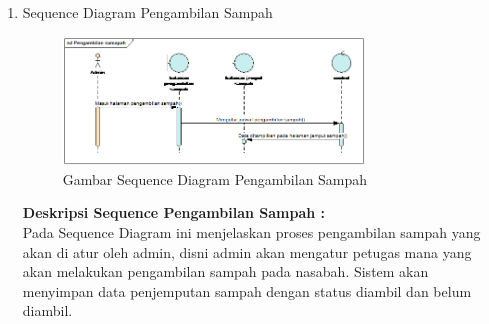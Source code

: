 \begin{enumerate}
\item Sequence Diagram Pengambilan Sampah
\hfill\\
	\begin{figure}[H]
		\includegraphics[width=8cm]{figures/analisis/10.png}
		\centering
		\caption{Gambar Sequence Diagram Pengambilan Sampah}
	\end{figure}
\textbf{Deskripsi Sequence Pengambilan Sampah :}
\hfill\\
Pada Sequence Diagram ini menjelaskan proses pengambilan sampah yang akan di atur oleh admin, disni admin akan mengatur petugas mana yang akan melakukan pengambilan sampah pada nasabah. Sistem akan menyimpan data penjemputan sampah dengan status diambil dan belum diambil.

\end{enumerate}

